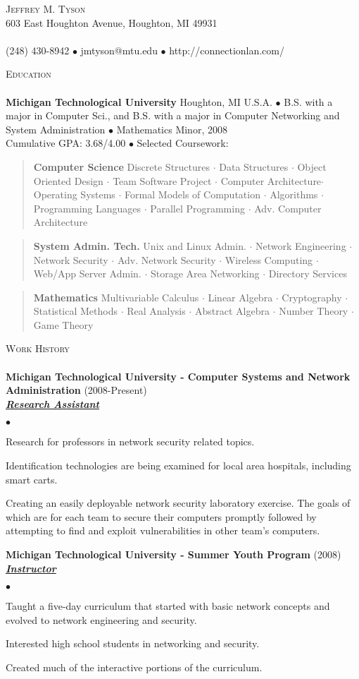 \documentclass{article}
\newcommand{\area}[2]{\vspace*{-9pt} \begin{verse}\textbf{#1}   #2 \end{verse}  }
\newcommand{\lineunder}{\vspace*{-8pt} \\ \hspace*{-18pt} \hrulefill \\}
\newcommand{\header}[1]{{\hspace*{-15pt}\vspace*{6pt} \textsc{#1}} \vspace*{-6pt} \lineunder}
\newcommand{\employer}[3]{{ \textbf{#1} (#2)\\ \underline{\textbf{\emph{#3}}}\\  }}
\newcommand{\contact}[3]{
\vspace*{-8pt}
\begin{center}
{\LARGE \scshape {#1}}\\
#2 \lineunder 
#3
\end{center}
\vspace*{-8pt}
}
\newenvironment{achievements}{\begin{list}{$\bullet$}{\topsep 0pt \itemsep -2pt}}{\vspace*{4pt}\end{list}}
\newcommand{\schoolwithcourses}[4]{
 \textbf{#1} #2 $\bullet$ #3\\ 
#4 $\bullet$  Selected Coursework:\\
\vspace*{5pt}
}
\begin{document}
\small
\smallskip
\vspace*{-44pt}

\contact{Jeffrey M. Tyson}
{603 East Houghton Avenue, Houghton, MI 49931}
{(248) 430-8942 $\bullet$ jmtyson@mtu.edu  $\bullet$ http://connectionlan.com/}

\header{Education}

\schoolwithcourses{Michigan Technological University}{Houghton, MI U.S.A.}{B.S. with a major in Computer Sci., and B.S. with a major in Computer Networking and System Administration $\bullet$ Mathematics Minor, 2008}
{Cumulative GPA: 3.68/4.00}
	\area{Computer Science}{ Discrete Structures $\cdot$ Data Structures $\cdot$ Object Oriented Design $\cdot$ 
Team Software Project $\cdot$ Computer Architecture$\cdot$ Operating Systems $\cdot$ Formal Models of Computation
$\cdot$ Algorithms $\cdot$ Programming Languages $\cdot$ Parallel Programming $\cdot$ Adv. Computer Architecture}
	\area{System Admin. Tech.}{Unix and Linux Admin. $\cdot$ Network Engineering 
	$\cdot$ Network Security $\cdot$ Adv. Network Security $\cdot$ Wireless Computing $\cdot$ Web/App Server Admin.
	$\cdot$ Storage Area Networking $\cdot$ Directory Services }
	\area{Mathematics}{Multivariable Calculus $\cdot$ Linear Algebra $\cdot$ Cryptography $\cdot$ Statistical Methods $\cdot$ Real Analysis $\cdot$ Abstract Algebra $\cdot$ Number Theory $\cdot$ Game Theory}

\header{Work History}
\employer{Michigan Technological University - Computer Systems and Network Administration}{2008-Present}{Research Assistant}
\begin{achievements}
	\item Research for professors in network security related topics.
	\item Identification technologies are being examined for local area hospitals, including smart carts.
	\item Creating an easily deployable network security laboratory exercise. 
			The goals of which are for each team to secure their computers promptly followed by attempting to find and exploit vulnerabilities in other team's computers.
\end{achievements}

\employer{Michigan Technological University - Summer Youth Program}{2008}{Instructor}
\begin{achievements}
	\item Taught a five-day curriculum that started with basic network concepts and evolved to network engineering and security.
	\item Interested high school students in networking and security.
	\item Created much of the interactive portions of the curriculum.
\end{achievements}
\end{document}
